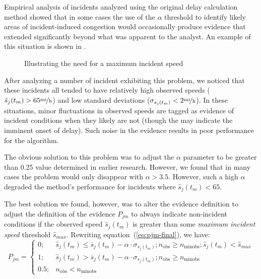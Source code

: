 \documentclass[12pt]{report}
\begin{document}
Empirical analysis of incidents analyzed using the original delay calculation
method showed that in some cases the use of the $\alpha$ threshold to identify
likely areas of incident-induced congestion would occasionally produce evidence
that extended significantly beyond what was apparent to the analyst.  An example
of this situation is shown in .
\begin{figure}[t]
  \centering
  \caption{Illustrating the need for a maximum incident speed}
  \label{fig:max-inc-spd}
\end{figure}

After analyzing a number of incident exhibiting this problem, we
noticed that these incidents all tended to have relatively high
observed speeds ($\hat{s}_j(t_m)>65\unitfrac{mi}{h}$) and low standard
deviations ($\sigma_{s_j(t_m)}<2\unitfrac{mi}{h}$).  In these
situations, minor fluctuations in observed speeds are tagged as
evidence of incident conditions when they likely are not (though the
may indicate the imminent onset of delay).  Such noise in the evidence
results in poor performance for the algorithm.  

The obvious solution to this problem was to adjust the $\alpha$
parameter to be greater than 0.25 value determined in earlier
research.  However, we found that in many cases the problem would only
disappear with $\alpha>3.5$.  However, such a high $\alpha$ degraded
the method's performance for incidents where $\hat{s}_j(t_m)<65$.  

The best solution we found, however, was to alter the evidence
definition to adjust the definition of the evidence $P_{jm}$ to always
indicate non-incident conditions if the observed speed
$\hat{s}_j(t_m)$ is greater than some \emph{maximum incident speed}
threshold $\hat{s}_{max}$.  Rewriting equation~(\ref{eq:pjm-final}),
we have:
\begin{equation}
  \label{eq:pjm-final-2}
  P_{jm} = 
  \begin{cases}
    0;& \hat{s}_j(t_m) \le \overline{s}_j(t_m) - \alpha\cdot\sigma_{s_j(t_m)}; n_{\mathrm{obs}} \ge n_{\textrm{minobs}};\hat{s}_j(t_m) < \hat{s}_{max} \\
    1;& \hat{s}_j(t_m) > \overline{s}_j(t_m) - \alpha\cdot\sigma_{s_j(t_m)}; n_{\mathrm{obs}} \ge n_{\textrm{minobs}}\\
    0.5;& n_{\mathrm{obs}} < n_{\textrm{minobs}}
  \end{cases}
\end{equation}
\end{document}
